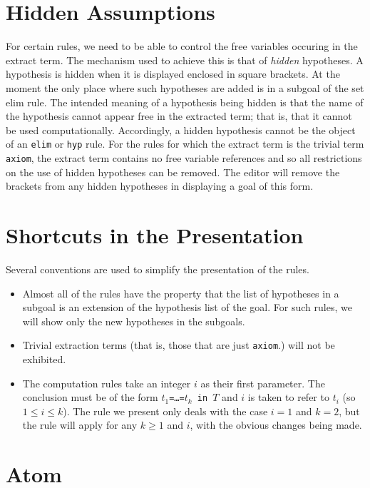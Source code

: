 \section{Hidden Assumptions}
For certain rules, we need to be able to control the free variables occuring
in the extract term.
The mechanism used to achieve this is that of {\em hidden} hypotheses.
A hypothesis is hidden when it is displayed enclosed in square brackets.
At the moment the only place where such hypotheses are added is in a subgoal
of the set elim rule.
The intended meaning of a hypothesis being hidden is that the name of the
hypothesis cannot appear free in the extracted term; that is, that it cannot
be used computationally.
Accordingly, a hidden hypothesis cannot be the object of an {\tt elim} or 
{\tt hyp} rule.
For the rules for which the extract term is the trivial term {\tt
axiom}, the extract term contains no free variable references
and so all restrictions on the use of
hidden hypotheses can be removed.
The editor will remove the brackets from any hidden hypotheses
in displaying a goal of this form.

\section{Shortcuts in the Presentation}

Several conventions are used to simplify the presentation of the rules.
\begin{itemize}
\item
Almost all of the rules have the property that the list of hypotheses in a
subgoal is an extension of the hypothesis list of the goal.  For such
rules, we will show
only the new hypotheses in the subgoals.
\item Trivial extraction terms (that is, those that are just {\tt axiom}.) 
will not be exhibited.
\item
The computation rules take an integer $i$ as their first parameter.  The
conclusion must be of the form \mbox{\tt $t_1$=\ldots=$t_k$ in $T$} and $i$
is taken to refer to $t_i$ (so $1 \le i \le k$).  The rule we present only
deals with the case $i=1$ and $k=2$, but the rule will apply for any $k\ge
1$ and $i$, with the obvious changes being made.
\end{itemize}




\section{Atom}
